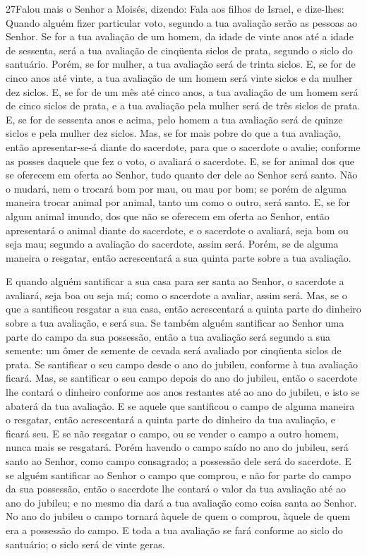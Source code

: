 \lettrine{27} Falou mais o Senhor a Moisés, dizendo: Fala
aos filhos de Israel, e dize-lhes: Quando alguém fizer particular
voto, segundo a tua avaliação serão as pessoas ao Senhor. Se for
a tua avaliação de um homem, da idade de vinte anos até a idade de
sessenta, será a tua avaliação de cinqüenta siclos de prata, segundo
o siclo do santuário. Porém, se for mulher, a tua avaliação será
de trinta siclos. E, se for de cinco anos até vinte, a tua
avaliação de um homem será vinte siclos e da mulher dez siclos.
E, se for de um mês até cinco anos, a tua avaliação de um homem
será de cinco siclos de prata, e a tua avaliação pela mulher será de
três siclos de prata. E, se for de sessenta anos e acima, pelo
homem a tua avaliação será de quinze siclos e pela mulher dez
siclos. Mas, se for mais pobre do que a tua avaliação, então
apresentar-se-á diante do sacerdote, para que o sacerdote o avalie;
conforme as posses daquele que fez o voto, o avaliará o sacerdote.
E, se for animal dos que se oferecem em oferta ao Senhor, tudo
quanto der dele ao Senhor será santo. Não o mudará, nem o
trocará bom por mau, ou mau por bom; se porém de alguma maneira
trocar animal por animal, tanto um como o outro, será santo.
E, se for algum animal imundo, dos que não se oferecem em
oferta ao Senhor, então apresentará o animal diante do sacerdote,
e o sacerdote o avaliará, seja bom ou seja mau; segundo a
avaliação do sacerdote, assim será. Porém, se de alguma
maneira o resgatar, então acrescentará a sua quinta parte sobre a
tua avaliação.

E quando alguém santificar a sua casa para ser santa ao Senhor, o
sacerdote a avaliará, seja boa ou seja má; como o sacerdote a
avaliar, assim será. Mas, se o que a santificou resgatar a
sua casa, então acrescentará a quinta parte do dinheiro sobre a tua
avaliação, e será sua. Se também alguém santificar ao Senhor
uma parte do campo da sua possessão, então a tua avaliação será
segundo a sua semente: um ômer de semente de cevada será avaliado
por cinqüenta siclos de prata. Se santificar o seu campo
desde o ano do jubileu, conforme à tua avaliação ficará. Mas,
se santificar o seu campo depois do ano do jubileu, então o
sacerdote lhe contará o dinheiro conforme aos anos restantes até ao
ano do jubileu, e isto se abaterá da tua avaliação. E se
aquele que santificou o campo de alguma maneira o resgatar, então
acrescentará a quinta parte do dinheiro da tua avaliação, e ficará
seu. E se não resgatar o campo, ou se vender o campo a outro
homem, nunca mais se resgatará. Porém havendo o campo saído
no ano do jubileu, será santo ao Senhor, como campo consagrado; a
possessão dele será do sacerdote. E se alguém santificar ao
Senhor o campo que comprou, e não for parte do campo da sua
possessão, então o sacerdote lhe contará o valor da tua
avaliação até ao ano do jubileu; e no mesmo dia dará a tua avaliação
como coisa santa ao Senhor. No ano do jubileu o campo tornará
àquele de quem o comprou, àquele de quem era a possessão do campo.
E toda a tua avaliação se fará conforme ao siclo do
santuário; o siclo será de vinte geras.


